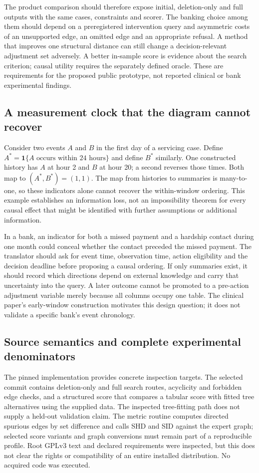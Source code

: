 The product comparison should therefore expose initial, deletion-only and full
outputs with the same cases, constraints and scorer. The banking choice among
them should depend on a preregistered intervention query and asymmetric costs
of an unsupported edge, an omitted edge and an appropriate refusal. A method
that improves one structural distance can still change a decision-relevant
adjustment set adversely. A better in-sample score is evidence about the search
criterion; causal utility requires the separately defined oracle. These are
requirements for the proposed public prototype, not reported clinical or bank
experimental findings.~\citep{exec24_ecmo_reference}

\subsection{A measurement clock that the diagram cannot recover}
Consider two events $A$ and $B$ in the first day of a servicing case. Define
$A^*=\mathbf{1}\{A\text{ occurs within 24 hours}\}$ and define $B^*$
similarly. One constructed history has $A$ at hour 2 and $B$ at hour 20; a
second reverses those times. Both map to $(A^*,B^*)=(1,1)$. The map from
histories to summaries is many-to-one, so these indicators alone cannot
recover the within-window ordering. This example establishes an information
loss, not an impossibility theorem for every causal effect that might be
identified with further assumptions or additional information.
\citep{exec24_ecmo_reference}

In a bank, an indicator for both a missed payment and a hardship contact during
one month could conceal whether the contact preceded the missed payment. The
translator should ask for event time, observation time, action eligibility and
the decision deadline before proposing a causal ordering. If only summaries
exist, it should record which directions depend on external knowledge and
carry that uncertainty into the query. A later outcome cannot be promoted
to a pre-action adjustment variable merely because all columns occupy one
table. The clinical paper's early-window construction motivates this design
question; it does not validate a specific bank's event chronology.
\citep{exec24_ecmo_original,exec24_ecmo_reference}

\subsection{Source semantics and complete experimental denominators}
The pinned implementation provides concrete inspection targets. The selected
commit contains deletion-only and full search routes, acyclicity and forbidden
edge checks, and a structured score that compares a tabular score with fitted
tree alternatives using the supplied data. The inspected tree-fitting path
does not supply a held-out validation claim. The metric routine computes
directed spurious edges by set difference and calls SHD and SID against the
expert graph; selected score variants and graph conversions must remain part
of a reproducible profile. Root GPLv3 text and declared requirements were
inspected, but this does not clear the rights or compatibility of an entire
installed distribution. No acquired code was executed.
\citep{exec24_ecmo_code}

